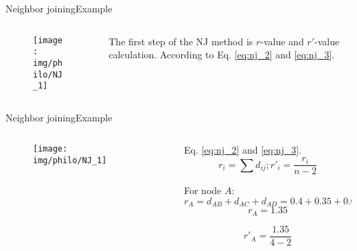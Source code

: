 \documentclass[10pt]{beamer}
\newcommand{\1}{
	\setbeamertemplate{background}{
		\texttt{[image: img/1]}
		\tikz[overlay] \fill[fill opacity=0.75,fill=white] (0,0) rectangle (-\paperwidth,\paperheight);
	}
}
\begin{document}
\begin{frame}{Neighbor joining}{Example}
	\begin{columns}
		\begin{column}{0.48\textwidth}
			\begin{figure}
				\texttt{[image: img/philo/NJ\_1]}
			\end{figure}
		\end{column}
		\begin{column}{0.48\textwidth}
			The first step of the NJ method is $r$-value and $r'$-value calculation. According to Eq. \ref{eq:nj_2} and \ref{eq:nj_3}.			
		\end{column}
	\end{columns}
\end{frame}



\begin{frame}{Neighbor joining}{Example}
	\begin{columns}
		\begin{column}{0.48\textwidth}
			\begin{figure}
				\texttt{[image: img/philo/NJ\_1]}
			\end{figure}
		\end{column}
		\begin{column}{0.48\textwidth}
			Eq. \ref{eq:nj_2} and \ref{eq:nj_3}.	
			\begin{equation*}
				r_i = \sum d_{ij}; r'_i =  \frac{r_i}{n-2}
			\end{equation*} 
			
			For node $A$:
			\begin{equation*}
			r_A = d_{AB} + d_{AC} + d_{AD} = 0.4 + 0.35 + 0.6
			\end{equation*}
			\begin{equation*}
			r_A  = 1.35
			\end{equation*}
			
			\begin{equation*}
			r'_A =  \frac{1.35}{4-2}
			\end{equation*}  
		\end{column}
	\end{columns}
\end{frame}
\end{document}
